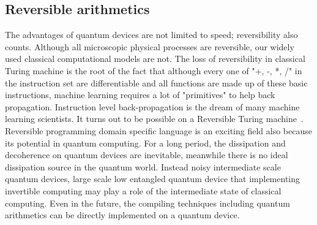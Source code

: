 \documentclass[aps,longbibliography,english,superscriptaddress]{revtex4-1}
\begin{document}
\subsection{Reversible arithmetics}
The advantages of quantum devices are not limited to speed; reversibility also counts.
Although all microscopic physical processes are reversible, our widely used classical computational models are not.
The loss of reversibility in classical Turing machine is the root of the fact that although every one of "+, -, *, /" in the instruction set are differentiable and all functions are made up of these basic instructions, machine learning requires a lot of "primitives" to help back propagation.
Instruction level back-propagation is the dream of many machine learning scientists. It turns out to be possible on a Reversible Turing machine~\cite{Perumalla2013}.
Reversible programming domain specific language is an exciting field also because its potential in quantum computing.
For a long period, the dissipation and decoherence on quantum devices are inevitable, meanwhile there is no ideal dissipation source in the quantum world.
Instead noisy intermediate scale quantum devices, large scale low entangled quantum device that implementing invertible computing may play a role of the intermediate state of classical computing. Even in the future, the compiling techniques including quantum arithmetics can be directly implemented on a quantum device.



\appendix
\end{document}
